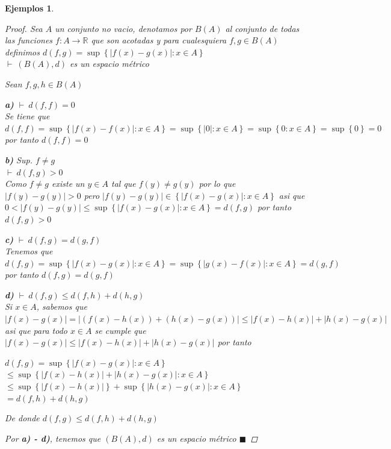 \documentclass[oneside]{book} %
\theoremstyle{Teorema}
\theoremstyle{Ejemplos}
\newtheorem{Ejemplos}[Definicion]{Ejemplos}
\theoremstyle{[Obs]}
\newcommand{\abs}[1]{\left|#1\right|} %
\renewcommand{\{}{\left\lbrace} %
\renewcommand{\}}{\right\rbrace} %
\newcommand{\R}{\mathbb{R}} %
\renewcommand{\qed}{$\blacksquare$} %
\newcommand{\pd}{$\vdash\ $} %
\begin{document}
\begin{Ejemplos}
				\begin{proof}
					
					Sea $A$ un conjunto no vacio, denotamos por $B(A)$ al conjunto de todas las funciones $f : A \to \R$ que son acotadas y para cualesquiera $f, g \in B(A)$ definimos $d(f, g) = \sup\{ \abs{f(x) - g(x)} : x \in A \}$ \\
					\pd $(B(A), d)$ es un espacio métrico

					Sean $f, g, h \in B(A)$

					\textbf{a)} \pd $d(f, f) = 0$ \\
					Se tiene que $d(f, f) = \sup\{ \abs{f(x) - f(x)} : x \in A \} = \sup\{ \abs{0} : x \in A \} = \sup\{ 0 : x \in A \} = \sup\{ 0 \} = 0$ por tanto $d(f, f) = 0$

					\textbf{b)} Sup. $f \neq g$ \\
					\pd $d(f, g) > 0$ \\
					Como $f \neq g$ existe un $y \in A$ tal que $f(y) \neq g(y)$ por lo que $\abs{f(y) - g(y)} > 0$ pero $\abs{f(y) - g(y)} \in \{ \abs{f(x) - g(x)} : x \in A \}$ asi que $0 < \abs{f(y) - g(y)} \leq \sup\{ \abs{f(x) - g(x)} : x \in A \} = d(f, g)$ por tanto $d(f, g) > 0$

					\textbf{c)} \pd $d(f, g) = d(g, f)$ \\
					Tenemos que $d(f, g) = \sup\{ \abs{f(x) - g(x)} : x \in A \} = \sup\{ \abs{g(x) - f(x)} : x \in A \} = d(g, f)$ por tanto $d(f, g) = d(g, f)$

					\textbf{d)} \pd $d(f, g) \leq d(f, h) + d(h, g)$ \\
					Si $x \in A$, sabemos que $\abs{f(x) - g(x)} = \abs{(f(x) - h(x)) + (h(x) - g(x))} \leq \abs{f(x) - h(x)} + \abs{h(x) - g(x)}$ asi que para todo $x \in A$ se cumple que $\abs{f(x) - g(x)} \leq \abs{f(x) - h(x)} + \abs{h(x) - g(x)}$ por tanto 
					
					$d(f, g) = \sup\{ \abs{f(x) - g(x)} : x \in A \}$ \\ 
					$\leq \sup\{ \abs{f(x) - h(x)} + \abs{h(x) - g(x)} : x \in A \}$ \\
					$\leq \sup\{ \abs{f(x) - h(x)} \} + \sup\{ \abs{h(x) - g(x)} : x \in A \}$ \\
					$= d(f, h) + d(h, g)$

					De donde $d(f, g) \leq d(f, h) + d(h, g)$

					Por \textbf{a) - d)}, tenemos que $(B(A), d)$ es un espacio métrico \qed

				\end{proof}


\end{Ejemplos}
\end{document}

